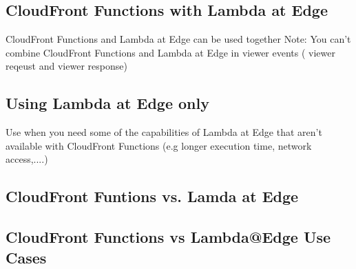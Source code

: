 \subsection{CloudFront Functions with Lambda at Edge}
CloudFront Functions and Lambda at Edge can be used together
Note: You can't combine CloudFront Functions and Lambda at Edge in viewer events ( viewer reqeust and viewer response)

\subsection{Using Lambda at Edge only}
Use when you need some of the capabilities of Lambda at Edge that aren't available with CloudFront Functions (e.g longer execution time, network access,....)

\subsection{CloudFront Funtions vs. Lamda at Edge}

\subsection{CloudFront Functions vs Lambda@Edge Use Cases}

